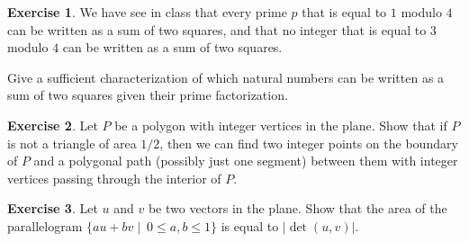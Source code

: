 \documentclass[12pt,a4paper]{article}
\theoremstyle{plain}
\newtheorem*{Sol*}{Solution}
\theoremstyle{definition}
\newtheorem{Ex}{Exercise}
\newif\ifsolutions
\newcommand{\exercise}[2]{
			\begin{Ex} #1 \end{Ex}
			\ifsolutions  \begin{Sol*} #2 \end{Sol*} \bigskip \else \bigskip  \fi
		}
\begin{document}
\exercise{
	We have see in class that every prime $p$ that is equal to $1$ modulo $4$ can be written as a sum of two squares, and that no integer that is equal to $3$ modulo $4$ can be written as a sum of two squares.

	Give a sufficient characterization of which natural numbers can be written as a sum of two squares given their prime factorization.
}
{}

\exercise{
	Let $P$ be a polygon with integer vertices in the plane. Show that if $P$ is not a triangle of area $1/2$, then we can find two integer points on the boundary of $P$ and a polygonal path (possibly just one segment) between them with integer vertices passing through the interior of $P$.

}
{}

\exercise{
	Let $u$ and $v$ be two vectors in the plane. Show that the area of the parallelogram
	$\{au+bv \mid ~0 \leq a, b \leq 1\}$ is equal to $|\det(u,v)|$.
  }
{}
\end{document}
